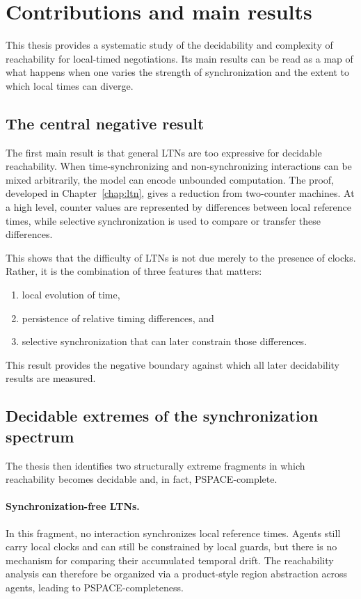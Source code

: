 \section{Contributions and main results}
\label{sec:intro-contrib}

This thesis provides a systematic study of the decidability and complexity of reachability for local-timed negotiations. Its main results can be read as a map of what happens when one varies the strength of synchronization and the extent to which local times can diverge.

\subsection{The central negative result}

The first main result is that general LTNs are too expressive for decidable reachability. When time-synchronizing and non-synchronizing interactions can be mixed arbitrarily, the model can encode unbounded computation. The proof, developed in Chapter~\ref{chap:ltn}, gives a reduction from two-counter machines. At a high level, counter values are represented by differences between local reference times, while selective synchronization is used to compare or transfer these differences.

This shows that the difficulty of LTNs is not due merely to the presence of clocks. Rather, it is the combination of three features that matters:
\begin{enumerate}
    \item local evolution of time,
    \item persistence of relative timing differences, and
    \item selective synchronization that can later constrain those differences.
\end{enumerate}

This result provides the negative boundary against which all later decidability results are measured.

\subsection{Decidable extremes of the synchronization spectrum}

The thesis then identifies two structurally extreme fragments in which reachability becomes decidable and, in fact, PSPACE-complete.

\paragraph{Synchronization-free LTNs.}
In this fragment, no interaction synchronizes local reference times. Agents still carry local clocks and can still be constrained by local guards, but there is no mechanism for comparing their accumulated temporal drift. The reachability analysis can therefore be organized via a product-style region abstraction across agents, leading to PSPACE-completeness.

